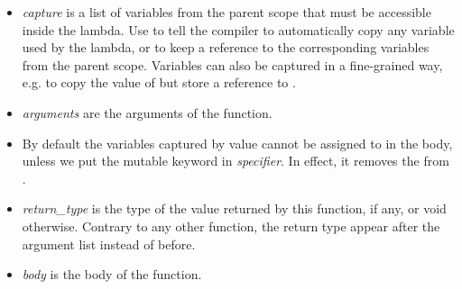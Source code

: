 \begin{itemize}
\item {\it capture} is a list of variables from the parent scope that
  must be accessible inside the lambda. Use \code{[=]} to tell the
  compiler to automatically copy any variable used by the lambda, or
  \code{[\&]} to keep a reference to the corresponding variables from
  the parent scope. Variables can also be captured in a fine-grained
  way, e.g. \code{[=a, \&b]} to copy the value of  but store a
  reference to .
\item {\it arguments} are the arguments of the function.
\item By default the variables captured by value cannot be assigned to
  in the body, unless we put the mutable keyword in {\it
    specifier}. In effect, it removes the  from
  .
\item {\it return\_type} is the type of the value returned by this
  function, if any, or void otherwise. Contrary to any other
  function, the return type appear after the argument list instead of
  before.
\item {\it body} is the body of the function.
\end{itemize}

